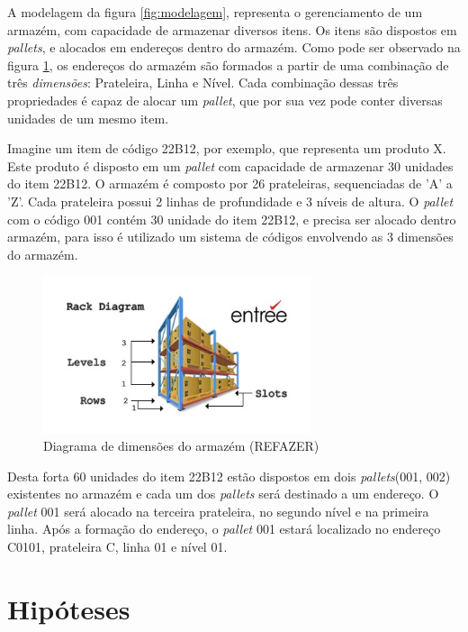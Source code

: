 A modelagem da figura \ref{fig:modelagem}, representa o gerenciamento de um armazém, com capacidade de armazenar diversos itens. Os itens são dispostos em \textit{pallets}, e alocados em endereços dentro do armazém. Como pode ser observado na figura \ref{fig:rack}, os endereços do armazém são formados a partir de uma combinação de três \emph{dimensões}: Prateleira, Linha e Nível. Cada combinação dessas três propriedades é capaz de alocar um \textit{pallet}, que por sua vez pode conter diversas unidades de um mesmo item.

Imagine um item de código 22B12, por exemplo, que representa um produto X. Este produto é disposto em um \textit{pallet} com capacidade de armazenar 30 unidades do item 22B12. O armazém é composto por 26 prateleiras, sequenciadas de 'A' a 'Z'. Cada prateleira possui 2 linhas de profundidade e  3 níveis de altura. O \textit{pallet} com o código 001 contém 30 unidade do item 22B12, e precisa ser alocado dentro armazém, para isso é utilizado um sistema de códigos envolvendo as 3 dimensões do armazém.


\begin{figure}[htbp]
\centering
\includegraphics[width=0.7\textwidth]{figuras/rack.jpg}
\caption{Diagrama de dimensões do armazém (REFAZER)}
\label{fig:rack}
\author{fonte: Autor}
\end{figure}

Desta forta 60 unidades do item 22B12 estão dispostos em dois \textit{pallets}(001, 002) existentes no armazém e cada um dos \textit{pallets} será destinado a um endereço. O \textit{pallet} 001 será alocado na terceira prateleira, no segundo nível e na primeira linha. Após a formação do endereço, o \textit{pallet} 001 estará localizado no endereço C0101, prateleira C, linha 01 e nível 01.

\section{Hipóteses} \label{sechHipóteses}

